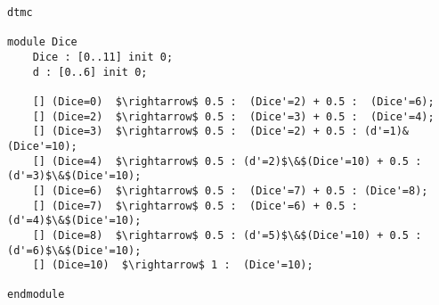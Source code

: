 \begin{lstlisting}[style=prism-color,caption={Generated PRISM program for the Dice Program.},captionpos=b,label={ex1-gen}]
dtmc

module Dice
	Dice : [0..11] init 0;
	d : [0..6] init 0; 

	[] (Dice=0)  $\rightarrow$ 0.5 :  (Dice'=2) + 0.5 :  (Dice'=6); 
	[] (Dice=2)  $\rightarrow$ 0.5 :  (Dice'=3) + 0.5 :  (Dice'=4); 
	[] (Dice=3)  $\rightarrow$ 0.5 :  (Dice'=2) + 0.5 : (d'=1)&(Dice'=10); 
	[] (Dice=4)  $\rightarrow$ 0.5 : (d'=2)$\&$(Dice'=10) + 0.5 : (d'=3)$\&$(Dice'=10);
	[] (Dice=6)  $\rightarrow$ 0.5 :  (Dice'=7) + 0.5 : (Dice'=8); 
	[] (Dice=7)  $\rightarrow$ 0.5 :  (Dice'=6) + 0.5 : (d'=4)$\&$(Dice'=10);
	[] (Dice=8)  $\rightarrow$ 0.5 : (d'=5)$\&$(Dice'=10) + 0.5 : (d'=6)$\&$(Dice'=10); 
	[] (Dice=10)  $\rightarrow$ 1 :  (Dice'=10);

endmodule
	
\end{lstlisting}

